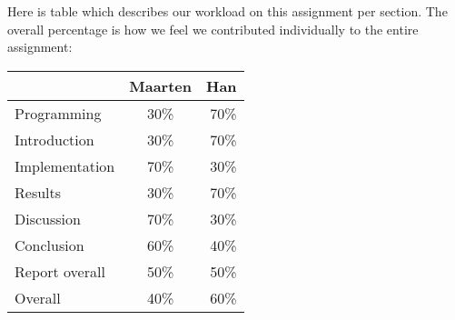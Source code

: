 Here is table which describes our workload on this assignment per section. The overall percentage is how we feel we contributed individually to the entire assignment:

\begin{tabular}{ l | c | r }
    		     & Maarten & Han \\ \hline
  Programming    & 30\%    & 70\% \\
  \hline
  Introduction   & 30\%    & 70\% \\
  Implementation & 70\%    & 30\% \\
  Results        & 30\%    & 70\% \\
  Discussion     & 70\%    & 30\% \\
  Conclusion     & 60\%    & 40\% \\
  \hline
  Report overall & 50\%    & 50\% \\ \hline \hline
  Overall        & 40\%    & 60\%
\end{tabular}